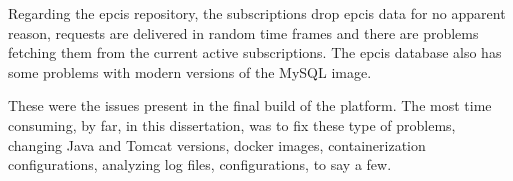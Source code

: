 Regarding the \ac{epcis} repository, the subscriptions drop \ac{epcis} data for no apparent reason, requests are delivered in random time frames and there are problems fetching them from the current active subscriptions. The \ac{epcis} database also has some problems with modern versions of the MySQL image.

These were the issues present in the final build of the platform. The most time consuming, by far, in this dissertation, was to fix these type of problems, changing Java and Tomcat versions, docker images, containerization configurations, analyzing log files, configurations, to say a few.